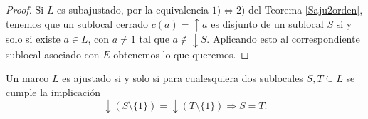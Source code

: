 \documentclass{comunicaciones}
\begin{document}
\begin{proof}
    Si $L$ es subajustado, por la equivalencia $1)\Leftrightarrow 2)$ del Teorema \ref{Saju2orden}, tenemos que un sublocal cerrado $c(a)=\uparrow a$ es disjunto de un sublocal $S$ si y solo si existe $a\in L$, con $a\neq 1$ tal que $a\notin \downarrow S$. Aplicando esto al correspondiente sublocal asociado con $E$ obtenemos lo que queremos.
\end{proof}

\begin{prop}\label{Proposicion6.4}
    Un marco $L$ es ajustado si y solo si para cualesquiera dos sublocales $S, T\subseteq L$ se cumple la implicación
    \[
    \downarrow(S\setminus \{1\})=\downarrow(T\setminus \{1\})\Rightarrow S=T.
    \]
\end{prop}
\end{document}
